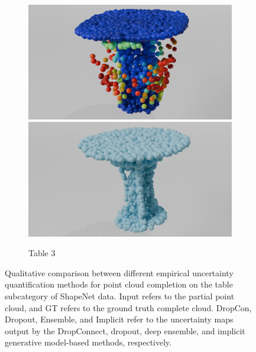 \begin{figure}[htb]
\begin{subfigure}[t]{0.315\textwidth}
            \includegraphics[width=\textwidth]{figures/iml_lin_t3.png}
            \includegraphics[width=\textwidth]{figures/com_t3.png}
            \caption{Table 3}
          \end{subfigure}
          \caption{Qualitative comparison between different empirical uncertainty quantification methods for point cloud completion on the table subcategory of ShapeNet data. Input refers to the partial point cloud, and GT refers to the ground truth complete cloud. DropCon, Dropout, Ensemble, and Implicit refer to the uncertainty maps output by the DropConnect, dropout, deep ensemble, and implicit generative model-based methods, respectively.}
          \label{fig:table}
        \end{figure}

